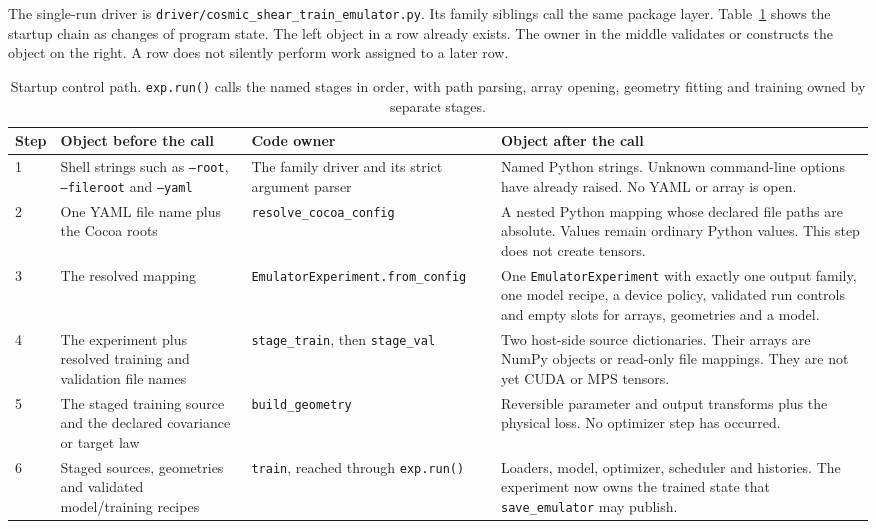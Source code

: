\documentclass[10pt,aps,prd,twocolumn,nofootinbib]{revtex4-2}
\newcommand{\code}[1]{\texttt{#1}}
\begin{document}
The single-run driver is \code{driver/cosmic\_shear\_train\_emulator.py}.  Its
family siblings call the same package layer.  Table~\ref{tab:startup-control}
shows the startup chain as changes of program state.  The left object in a row
already exists.  The owner in the middle validates or constructs the object
on the right.  A row does not silently perform work assigned to a later row.

\begin{table}[t]
\centering
\begin{tabular}{p{}p{}p{}
                p{}}
\toprule
Step & Object before the call & Code owner & Object after the call \\
\midrule
1 & Shell strings such as \code{--root}, \code{--fileroot} and
    \code{--yaml}
  & The family driver and its strict argument parser
  & Named Python strings.  Unknown command-line options have already raised.
    No YAML or array is open.  \\
2 & One YAML file name plus the Cocoa roots
  & \code{resolve\_cocoa\_config}
  & A nested Python mapping whose declared file paths are absolute.  Values
    remain ordinary Python values.  This step does not create tensors.  \\
3 & The resolved mapping
  & \code{EmulatorExperiment.}\newline\code{from\_config}
  & One \code{EmulatorExperiment} with exactly one output family, one model
    recipe, a device policy, validated run controls and empty slots for
    arrays, geometries and a model.  \\
4 & The experiment plus resolved training and validation file names
  & \code{stage\_train}, then \code{stage\_val}
  & Two host-side source dictionaries.  Their arrays are NumPy objects or
    read-only file mappings.  They are not yet CUDA or MPS tensors.  \\
5 & The staged training source and the declared covariance or target law
  & \code{build\_geometry}
  & Reversible parameter and output transforms plus the physical loss.  No
    optimizer step has occurred.  \\
6 & Staged sources, geometries and validated model/training recipes
  & \code{train}, reached through \code{exp.run()}
  & Loaders, model, optimizer, scheduler and histories.  The experiment now
    owns the trained state that \code{save\_emulator} may publish.  \\
\bottomrule
\end{tabular}
\caption{Startup control path.  \code{exp.run()} calls the named stages in
order, with path parsing, array opening, geometry fitting and training owned by
separate stages.}
\label{tab:startup-control}
\end{table}
\end{document}
